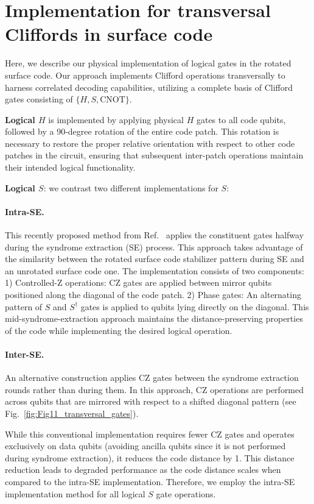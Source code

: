 \documentclass[aps, prx, reprint, superscriptaddress, longbibliography, floatfix]{revtex4-2}
\begin{document}
\section{Implementation for transversal Cliffords in surface code}
\label{sec:Cliffords_implementation_details}
Here, we describe our physical implementation of logical gates in the rotated surface code. Our approach implements Clifford operations transversally to harness correlated decoding capabilities, utilizing a complete basis of Clifford gates consisting of $\{H, S, \textrm{CNOT}\}$.

\textbf{Logical $H$} is implemented by applying physical $H$ gates to all code qubits, followed by a 90-degree rotation of the entire code patch. This rotation is necessary to restore the proper relative orientation with respect to other code patches in the circuit, ensuring that subsequent inter-patch operations maintain their intended logical functionality.


\textbf{Logical $S$}: we contrast two different implementations for $S$:
 \paragraph{Intra-SE.}
 This recently proposed method from Ref.~\cite{Chen2024} applies the constituent gates halfway during the syndrome extraction (SE) process. This approach takes advantage of the similarity between the rotated surface code stabilizer pattern during SE and an unrotated surface code one. The implementation consists of two components:
1) Controlled-Z operations: CZ gates are applied between mirror qubits positioned along the diagonal of the code patch. 2) Phase gates: An alternating pattern of $S$ and $S^{\dagger}$ gates is applied to qubits lying directly on the diagonal. This mid-syndrome-extraction approach maintains the distance-preserving properties of the code while implementing the desired logical operation.

\paragraph{Inter-SE.}

An alternative construction applies CZ gates between the syndrome extraction rounds rather than during them. In this approach, CZ operations are performed across qubits that are mirrored with respect to a shifted diagonal pattern (see Fig.~\ref{fig:Fig11_transversal_gates}).

While this conventional implementation requires fewer CZ gates and operates exclusively on data qubits (avoiding ancilla qubits since it is not performed during syndrome extraction), it reduces the code distance by 1. This distance reduction leads to degraded performance as the code distance scales when compared to the intra-SE implementation. Therefore, we employ the intra-SE implementation method for all logical $S$ gate operations.
\end{document}
